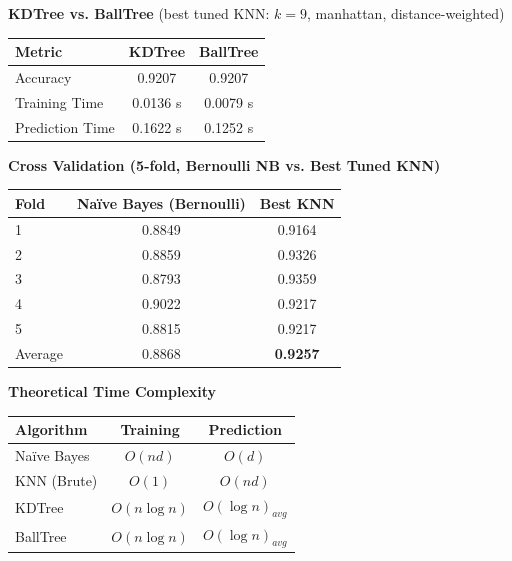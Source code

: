 \documentclass[12pt,a4paper]{article}
\newenvironment{fitwidth}
  {\begin{lrbox}{\fitbox}}
  {\end{lrbox}\ifdim\wd\fitbox>\linewidth\resizebox{\linewidth}{!}{\usebox{\fitbox}}\else\usebox{\fitbox}\fi}
\DeclareRobustCommand{\_}{\textunderscore\allowbreak}
\begin{document}
\vspace{0.3cm}
\begin{center}
\begin{minipage}{\linewidth}\centering
\textbf{KDTree vs. BallTree} (best tuned KNN: $k=9$, manhattan, distance-weighted)\par\smallskip
\begin{fitwidth}
\begin{tabular}{lcc}
\toprule
Metric & KDTree & BallTree \\
\midrule
Accuracy         & 0.9207 & 0.9207 \\
Training Time    & 0.0136 s & 0.0079 s \\
Prediction Time  & 0.1622 s & 0.1252 s \\
\bottomrule
\end{tabular}
\end{fitwidth}
\end{minipage}
\end{center}

\vspace{0.3cm}
\begin{center}
\begin{minipage}{\linewidth}\centering
\textbf{Cross Validation (5-fold, Bernoulli NB vs. Best Tuned KNN)}\par\smallskip
\begin{fitwidth}
\begin{tabular}{lcc}
\toprule
Fold & Na\"ive Bayes (Bernoulli) & Best KNN \\
\midrule
1 & 0.8849 & 0.9164 \\
2 & 0.8859 & 0.9326 \\
3 & 0.8793 & 0.9359 \\
4 & 0.9022 & 0.9217 \\
5 & 0.8815 & 0.9217 \\
\midrule
Average & 0.8868 & \textbf{0.9257} \\
\bottomrule
\end{tabular}
\end{fitwidth}
\end{minipage}
\end{center}

\vspace{0.3cm}
\begin{center}
\begin{minipage}{\linewidth}\centering
\textbf{Theoretical Time Complexity}\par\smallskip
\begin{fitwidth}
\begin{tabular}{lcc}
\toprule
Algorithm & Training & Prediction \\
\midrule
Na\"ive Bayes  & $O(nd)$      & $O(d)$ \\
KNN (Brute)   & $O(1)$       & $O(nd)$ \\
KDTree        & $O(n\log n)$ & $O(\log n)_{avg}$ \\
BallTree      & $O(n\log n)$ & $O(\log n)_{avg}$ \\
\bottomrule
\end{tabular}
\end{fitwidth}
\end{minipage}
\end{center}
\end{document}
